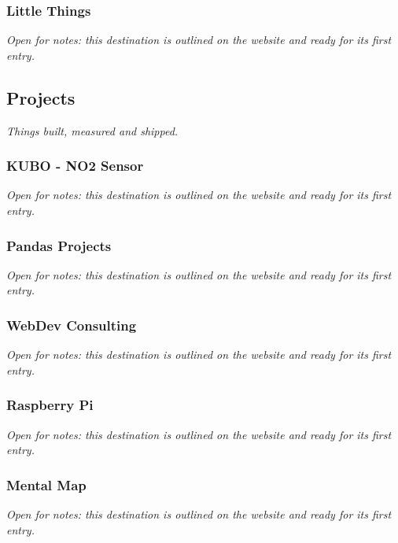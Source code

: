 \documentclass{article}
\begin{document}
\subsubsection{Little Things}\label{sec:little-things}
\textit{Open for notes: this destination is outlined on the website and ready for its first entry.}

\subsection{Projects}\label{sec:projects}
\textit{Things built, measured and shipped.}

\subsubsection{KUBO - NO2 Sensor}\label{sec:kubo-no2-sensor}
\textit{Open for notes: this destination is outlined on the website and ready for its first entry.}

\subsubsection{Pandas Projects}\label{sec:pandas-projects}
\textit{Open for notes: this destination is outlined on the website and ready for its first entry.}

\subsubsection{WebDev Consulting}\label{sec:projects-webdev-consulting}
\textit{Open for notes: this destination is outlined on the website and ready for its first entry.}

\subsubsection{Raspberry Pi}\label{sec:raspberry-pi}
\textit{Open for notes: this destination is outlined on the website and ready for its first entry.}

\subsubsection{Mental Map}\label{sec:mental-map}
\textit{Open for notes: this destination is outlined on the website and ready for its first entry.}
\end{document}
